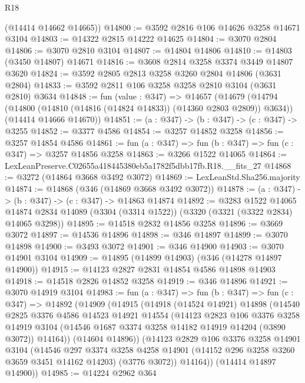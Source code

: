 \begin{lexlean}{R18}
\begin{coremodule}
      (@14414 @14662 @14665))
@14800 := @3592 @2816 @106 @14626 @3258 @14671 @3104
@14803 := @14322 @2815 @14222 @14625
@14804 := @3070 @2804
@14806 := @3070 @2810 @3104
@14807 := @14804 @14806
@14810 := @14803 (@3450 @14807) @14671
@14816 := @3608 @2814 @3258 @3374 @3449 @14807 @3620
@14824 := @3592 @2805 @2813 @3258 @3260 @2804 @14806 (@3631 @2804)
@14833 := @3592 @2811 @106 @3258 @3258 @2810 @3104 (@3631 @2810) @3634
@14848 := fun (value : @347) =>
  @14657
    (@14679
      (@14794 (@14800 (@14810 (@14816 (@14824 @14833)) (@14360 @2803 @2809)) @3634))
      (@14414 @14666 @14670))
@14851 := (a : @347) -> (b : @347) -> (c : @347) -> @3255
@14852 := @3377 @4586
@14854 := @3257 @14852 @3258
@14856 := @3257 @14854 @4586
@14861 := fun (a : @347) => fun (b : @347) => fun (c : @347) => @3257 @14856 @3258
@14863 := @3266 @1522 @14065
@14864 := LexLeanPreserve.C02655a418445380eb5a1782f5dbb17fb.R18.__fits_27
@14868 := @3272 (@14864 @3668 @3492 @3072)
@14869 := LexLeanStd.Sha256.majority
@14874 := @14868 (@346 (@14869 @3668 @3492 @3072))
@14878 := (a : @347) -> (b : @347) -> (c : @347) -> @14863 @14874
@14892 := @3283
    @1522
    @14065
    @14874
    @2834
    @14089
    (@3304 (@3314 @1522))
    (@3320 (@3321 (@3322 @2834) @14065 @3298))
@14895 := @14518 @2832 @14856 @3258
@14896 := @3669 @3072
@14897 := @14536 @14896
@14898 := @346 @14897
@14899 := @3070 @14898
@14900 := @3493 @3072
@14901 := @346 @14900
@14903 := @3070 @14901 @3104
@14909 := @14895 (@14899 @14903) (@346 (@14278 @14897 @14900))
@14915 := @14123 @2827 @2831 @14854 @4586 @14898 @14903
@14918 := @14518 @2826 @14852 @3258
@14919 := @346 @14896
@14921 := @3070 @14919 @3104
@14983 := fun (a : @347) =>
  fun (b : @347) =>
  fun (c : @347) =>
  @14892
    (@14909
      (@14915
        (@14918
          (@14524 @14921)
          @14898
          (@14540
            @2825
            @3376
            @4586
            @14523
            @14921
            @14554
            (@14123
              @2823
              @106
              @3376
              @3258
              @14919
              @3104
              (@14546 @1687 @3374 @3258 @14182 @14919 @14204 (@3890 @3072))
              @14164))
          (@14604 @14896))
        (@14123
          @2829
          @106
          @3376
          @3258
          @14901
          @3104
          (@14546
            @297
            @3374
            @3258
            @4258
            @14901
            (@14152 @296 @3258 @3260 @3659 @3451 @14162 @14203)
            (@3776 @3072))
          @14164))
      (@14414 @14897 @14900))
@14985 := @14224 @2962 @364

\end{coremodule}
\end{lexlean}
